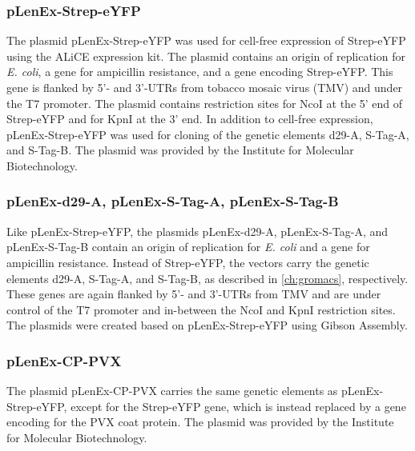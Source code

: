 \subsubsection{pLenEx-Strep-eYFP}
The plasmid pLenEx-Strep-eYFP was used for cell-free expression of Strep-eYFP using the ALiCE\textsuperscript{\textregistered} expression kit. The plasmid contains an origin of replication for \emph{E. coli}, a gene for ampicillin resistance, and a gene encoding Strep-eYFP. This gene is flanked by 5'- and 3'-UTRs from tobacco mosaic virus (TMV) and under the T7 promoter. The plasmid contains restriction sites for NcoI at the 5' end of Strep-eYFP and for KpnI at the 3' end. In addition to cell-free expression, pLenEx-Strep-eYFP was used for cloning of the genetic elements d29-A, S-Tag-A, and S-Tag-B. The plasmid was provided by the Institute for Molecular Biotechnology.

\subsubsection{pLenEx-d29-A, pLenEx-S-Tag-A, pLenEx-S-Tag-B}
Like pLenEx-Strep-eYFP, the plasmids pLenEx-d29-A, pLenEx-S-Tag-A, and pLenEx-S-Tag-B contain an origin of replication for \emph{E. coli} and a gene for ampicillin resistance. Instead of Strep-eYFP, the vectors carry the genetic elements d29-A, S-Tag-A, and S-Tag-B, as described in \autoref{ch:gromacs}, respectively. These genes are again flanked by 5'- and 3'-UTRs from TMV and are under control of the T7 promoter and in-between the NcoI and KpnI restriction sites. The plasmids were created based on pLenEx-Strep-eYFP using Gibson Assembly.


\subsubsection{pLenEx-CP-PVX}
The plasmid pLenEx-CP-PVX carries the same genetic elements as pLenEx-Strep-eYFP, except for the Strep-eYFP gene, which is instead replaced by a gene encoding for the PVX coat protein. The plasmid was provided by the Institute for Molecular Biotechnology.
\FloatBarrier
